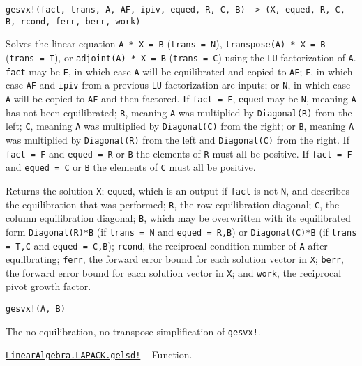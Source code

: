 \begin{adjustwidth}{2em}{0pt}


\begin{verbatim}
gesvx!(fact, trans, A, AF, ipiv, equed, R, C, B) -> (X, equed, R, C, B, rcond, ferr, berr, work)
\end{verbatim}

Solves the linear equation \texttt{A * X = B} (\texttt{trans = N}), \texttt{transpose(A) * X = B} (\texttt{trans = T}), or \texttt{adjoint(A) * X = B} (\texttt{trans = C}) using the \texttt{LU} factorization of \texttt{A}. \texttt{fact} may be \texttt{E}, in which case \texttt{A} will be equilibrated and copied to \texttt{AF}; \texttt{F}, in which case \texttt{AF} and \texttt{ipiv} from a previous \texttt{LU} factorization are inputs; or \texttt{N}, in which case \texttt{A} will be copied to \texttt{AF} and then factored. If \texttt{fact = F}, \texttt{equed} may be \texttt{N}, meaning \texttt{A} has not been equilibrated; \texttt{R}, meaning \texttt{A} was multiplied by \texttt{Diagonal(R)} from the left; \texttt{C}, meaning \texttt{A} was multiplied by \texttt{Diagonal(C)} from the right; or \texttt{B}, meaning \texttt{A} was multiplied by \texttt{Diagonal(R)} from the left and \texttt{Diagonal(C)} from the right. If \texttt{fact = F} and \texttt{equed = R} or \texttt{B} the elements of \texttt{R} must all be positive. If \texttt{fact = F} and \texttt{equed = C} or \texttt{B} the elements of \texttt{C} must all be positive.

Returns the solution \texttt{X}; \texttt{equed}, which is an output if \texttt{fact} is not \texttt{N}, and describes the equilibration that was performed; \texttt{R}, the row equilibration diagonal; \texttt{C}, the column equilibration diagonal; \texttt{B}, which may be overwritten with its equilibrated form \texttt{Diagonal(R)*B} (if \texttt{trans = N} and \texttt{equed = R,B}) or \texttt{Diagonal(C)*B} (if \texttt{trans = T,C} and \texttt{equed = C,B}); \texttt{rcond}, the reciprocal condition number of \texttt{A} after equilbrating; \texttt{ferr}, the forward error bound for each solution vector in \texttt{X}; \texttt{berr}, the forward error bound for each solution vector in \texttt{X}; and \texttt{work}, the reciprocal pivot growth factor.




\begin{lstlisting}
gesvx!(A, B)
\end{lstlisting}

The no-equilibration, no-transpose simplification of \texttt{gesvx!}.



\end{adjustwidth}
\hypertarget{9350383558985209547}{} 
\hyperlink{9350383558985209547}{\texttt{LinearAlgebra.LAPACK.gelsd!}}  -- {Function.}

